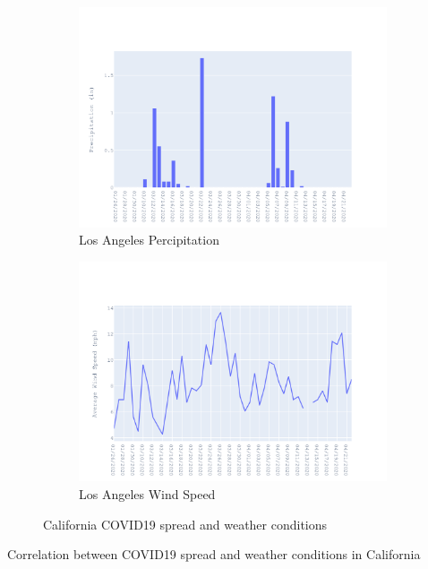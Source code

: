 \documentclass{homework}
\begin{document}
\begin{figure}[H]
  \begin{subfigure}{0.45\linewidth}
    \includegraphics[width=\linewidth]{task4/California_rain.png}
    \caption{Los Angeles Percipitation}
  \end{subfigure}
  \hfil
  \begin{subfigure}{0.45\linewidth}
    \includegraphics[width=\linewidth]{task4/California_wnd.png}
    \caption{Los Angeles Wind Speed}
  \end{subfigure}

  \caption{California COVID19 spread and weather conditions}
  \label{fig:task4CA}
\end{figure}

\begin{table}[H]
  \caption{Correlation between COVID19 spread and weather conditions in California}
  \label{Task 4 California}
  \centering
  
\end{table}
\end{document}
